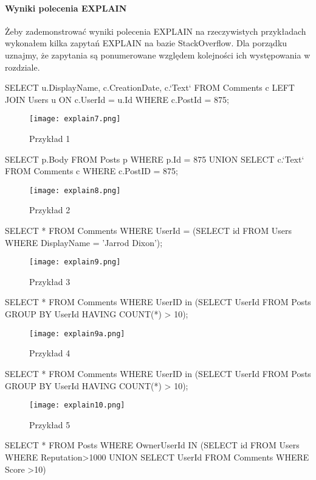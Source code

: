 \paragraph{Wyniki polecenia EXPLAIN}
Żeby zademonstrować wyniki polecenia EXPLAIN na rzeczywistych przykładach wykonałem kilka zapytań EXPLAIN na bazie StackOverflow. Dla porządku uznajmy, że zapytania są ponumerowane względem kolejności ich występowania w rozdziale.
\begin{spverbatim}
	SELECT u.DisplayName, c.CreationDate, c.`Text` FROM  Comments c LEFT JOIN Users u ON c.UserId = u.Id WHERE c.PostId = 875;
\end{spverbatim}
\begin{figure}[H]
	\texttt{[image: explain7.png]} 
	\caption{Przykład 1}
\end{figure}
\begin{spverbatim}
	SELECT p.Body FROM Posts p WHERE p.Id = 875 UNION
	SELECT c.`Text` FROM Comments c WHERE c.PostID = 875;
\end{spverbatim}
\begin{figure}[H]
	\texttt{[image: explain8.png]} 
	\caption{Przykład 2}
\end{figure}
\begin{spverbatim}
	SELECT * FROM Comments WHERE UserId = (SELECT id FROM Users WHERE DisplayName = 'Jarrod Dixon');
\end{spverbatim}
\begin{figure}[H]
	\texttt{[image: explain9.png]} 
	\caption{Przykład 3}
\end{figure}
\begin{spverbatim}
	SELECT * FROM Comments WHERE UserID in (SELECT UserId FROM Posts GROUP BY UserId HAVING COUNT(*) > 10);
\end{spverbatim}
\begin{figure}[H]
	\texttt{[image: explain9a.png]} 
	\caption{Przykład 4}
\end{figure}
\begin{spverbatim}
	SELECT * FROM Comments WHERE UserID in (SELECT UserId FROM Posts GROUP BY UserId HAVING COUNT(*) > 10);
\end{spverbatim}
\begin{figure}[H]
	\texttt{[image: explain10.png]} 
	\caption{Przykład 5}
\end{figure}
\begin{spverbatim}
	SELECT * FROM Posts  WHERE OwnerUserId IN (SELECT id FROM Users WHERE Reputation>1000 UNION SELECT UserId FROM Comments WHERE Score >10)
\end{spverbatim}
